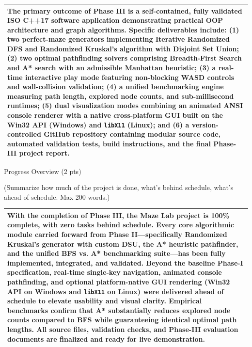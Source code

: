 \documentclass[12pt,a4paper]{article}
\newcommand{\secthead}[2]{%
  {\fontsize{18}{21.9}\selectfont\color{geheading}#1\par}\vspace{1.6pt}%
  {\fontsize{10.5}{14.5}\selectfont\color{gehint}#2\par}%
  \vspace{\secgap}}
\newlength{\secgap}\setlength{\secgap}{5.7pt}
\newcommand{\afterbox}{\vspace{\aftergap}}
\newlength{\aftergap}\setlength{\aftergap}{12pt}
\newenvironment{answerbox}{%
  \noindent\begin{tabular}{|p{\dimexpr\textwidth-2\tabcolsep-2\arrayrulewidth\relax}|}\hline
  \fontsize{10.8}{13.3}\selectfont\setlength{\parskip}{3.5pt}\rule{0pt}{18pt}\ignorespaces}{%
  \rule[-11pt]{0pt}{0pt}\\\hline\end{tabular}\par}
\begin{document}
\begin{answerbox}
The primary outcome of Phase III is a self-contained, fully validated ISO C++17 software application demonstrating practical OOP architecture and graph algorithms. Specific deliverables include: (1) two perfect-maze generators implementing Iterative Randomized DFS and Randomized Kruskal's algorithm with Disjoint Set Union; (2) two optimal pathfinding solvers comprising Breadth-First Search and A* search with an admissible Manhattan heuristic; (3) a real-time interactive play mode featuring non-blocking WASD controls and wall-collision validation; (4) a unified benchmarking engine measuring path length, explored node counts, and sub-millisecond runtimes; (5) dual visualization modes combining an animated ANSI console renderer with a native cross-platform GUI built on the Win32 API (Windows) and \texttt{libX11} (Linux); and (6) a version-controlled GitHub repository containing modular source code, automated validation tests, build instructions, and the final Phase-III project report.
\end{answerbox}

\afterbox

\secthead{Progress Overview (2 pts)}{(Summarize how much of the project is done, what's behind schedule, what's ahead of schedule. Max 200 words.)}

\begin{answerbox}
With the completion of Phase III, the Maze Lab project is 100\% complete, with zero tasks behind schedule. Every core algorithmic module carried forward from Phase II---specifically Randomized Kruskal's generator with custom DSU, the A* heuristic pathfinder, and the unified BFS vs. A* benchmarking suite---has been fully implemented, integrated, and validated. Beyond the baseline Phase-I specification, real-time single-key navigation, animated console pathfinding, and optional platform-native GUI rendering (Win32 API on Windows and \texttt{libX11} on Linux) were delivered ahead of schedule to elevate usability and visual clarity. Empirical benchmarks confirm that A* substantially reduces explored node counts compared to BFS while guaranteeing identical optimal path lengths. All source files, validation checks, and Phase-III evaluation documents are finalized and ready for live demonstration.
\end{answerbox}

\newpage

\end{document}
